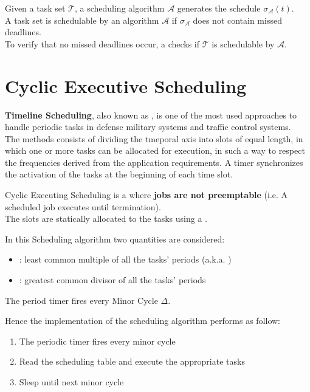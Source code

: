 Given a task set $\mathcal{T}$, a scheduling algorithm $\mathcal{A}$ generates the schedule $\sigma_\mathcal{A}(t)$.\\
A task set is schedulable by an algorithm $\mathcal{A}$ if $\sigma_\mathcal{A}$ does not contain missed deadlines.\\
To verify that no missed deadlines occur, a  checks if $\mathcal{T}$ is schedulable by $\mathcal{A}$.

\section{Cyclic Executive Scheduling}

\textbf{Timeline Scheduling}, also known as , is one of the most used approaches to handle periodic tasks in defense military systems and traffic control systems.\\
The methods consists of dividing the tmeporal axis into slots of equal length, in which one or more tasks can be allocated for execution, in such a way to respect the frequencies derived from the application requirements. A timer synchronizes the activation of the tasks at the beginning of each time slot.

Cyclic Executing Scheduling is a  where \textbf{jobs are not preemptable} (i.e. A scheduled job executes until termination).\\
The slots are statically allocated to the tasks using a .

In this Scheduling algorithm two quantities are considered:
\begin{itemize}
    \item {}: least common multiple of all the tasks' periods (a.k.a. )
    \item {}: greatest common divisor of all the tasks' periods
\end{itemize}
The period timer fires every Minor Cycle $\Delta$.

Hence the implementation of the scheduling algorithm performs as follow:
\begin{enumerate}
    \item The periodic timer fires every minor cycle
    \item Read the scheduling table and execute the appropriate tasks
    \item Sleep until next minor cycle
\end{enumerate}

